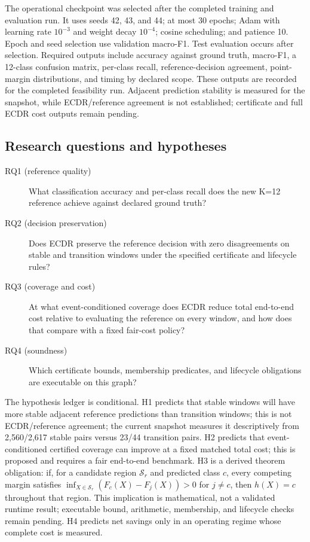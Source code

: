\documentclass[11pt,a4paper]{article}
\begin{document}
The operational checkpoint was selected after the completed training and
evaluation run. It uses seeds 42, 43, and 44; at most 30 epochs; Adam with learning rate
$10^{-3}$ and weight decay $10^{-4}$; cosine scheduling; and patience 10.
Epoch and seed selection use validation macro-F1. Test evaluation occurs after
selection. Required outputs include accuracy against ground truth, macro-F1,
a 12-class confusion matrix, per-class recall, reference-decision agreement,
point-margin distributions, and timing by declared scope. These outputs are
recorded for the completed feasibility run. Adjacent prediction stability is
measured for the snapshot, while ECDR/reference agreement is not established;
certificate and full ECDR cost outputs remain pending.

\subsection{Research questions and hypotheses}
\begin{description}
\item[RQ1 (reference quality)] What classification accuracy and per-class
recall does the new K=12 reference achieve against declared ground truth?
\item[RQ2 (decision preservation)] Does ECDR preserve the reference decision
with zero disagreements on stable and transition windows under the specified
certificate and lifecycle rules?
\item[RQ3 (coverage and cost)] At what event-conditioned coverage does ECDR
reduce total end-to-end cost relative to evaluating the reference on every
window, and how does that compare with a fixed fair-cost policy?
\item[RQ4 (soundness)] Which certificate bounds, membership predicates, and
lifecycle obligations are executable on this graph?
\end{description}

The hypothesis ledger is conditional. H1 predicts that stable windows will
have more stable adjacent reference predictions than transition windows; this
is not ECDR/reference agreement; the current snapshot measures it descriptively
from 2,560/2,617 stable pairs versus 23/44 transition pairs. H2 predicts that
event-conditioned certified coverage can improve at a fixed matched
total cost; this is proposed and requires a fair end-to-end benchmark. H3 is a
derived theorem obligation: if, for a candidate region $\mathcal S_r$ and
predicted class $c$, every competing margin satisfies
$\inf_{X\in\mathcal S_r}(F_c(X)-F_j(X))>0$ for $j\ne c$, then $h(X)=c$
throughout that region. This implication is mathematical, not a validated
runtime result; executable bound, arithmetic, membership, and lifecycle checks
remain pending. H4 predicts net savings only in an operating regime whose
complete cost is measured.
\end{document}
